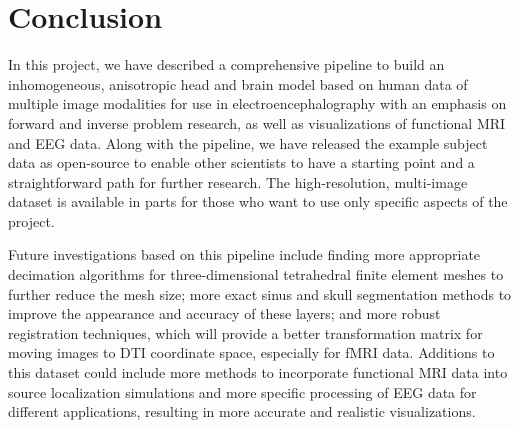 %
%

\section{Conclusion}
\label{sec:Conclusion}


In this project, we have described a comprehensive pipeline to build an inhomogeneous, anisotropic head and brain model based on human data of multiple image modalities for use in electroencephalography with an emphasis on forward and inverse problem research, as well as visualizations of functional MRI and EEG data. Along with the pipeline, we have released the example subject data as open-source to enable other scientists to have a starting point and a straightforward path for further research. The high-resolution, multi-image dataset is available in parts for those who want to use only specific aspects of the project.

Future investigations based on this pipeline include finding more appropriate decimation algorithms for three-dimensional tetrahedral finite element meshes to further reduce the mesh size; more exact sinus and skull segmentation methods to improve the appearance and accuracy of these layers; and more robust registration techniques, which will provide a better transformation matrix for moving images to DTI coordinate space, especially for fMRI data. Additions to this dataset could include more methods to incorporate functional MRI data into source localization simulations and more specific processing of EEG data for different applications, resulting in more accurate and realistic visualizations. 